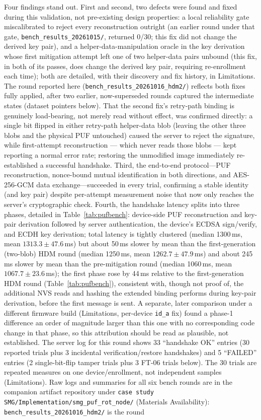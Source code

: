\documentclass[preprint,12pt,authoryear]{elsarticle}
\begin{document}
Four findings stand out. First and second, two defects were found and fixed during this validation, not pre-existing design properties: a local reliability gate miscalibrated to reject every reconstruction outright (an earlier round under that gate, \texttt{bench\_results\_20261015/}, returned 0/30; this fix did not change the derived key pair), and a helper-data-manipulation oracle in the key derivation whose first mitigation attempt left one of two helper-data pairs unbound (this fix, in both of its passes, does change the derived key pair, requiring re-enrollment each time); both are detailed, with their discovery and fix history, in Limitations. The round reported here (\texttt{bench\_results\_20261016\_hdm2/}) reflects both fixes fully applied, after two earlier, now-superseded rounds captured the intermediate states (dataset pointers below). That the second fix's retry-path binding is genuinely load-bearing, not merely read without effect, was confirmed directly: a single bit flipped in either retry-path helper-data blob (leaving the other three blobs and the physical PUF untouched) caused the server to reject the signature, while first-attempt reconstruction --- which never reads those blobs --- kept reporting a normal error rate; restoring the unmodified image immediately re-established a successful handshake. Third, the end-to-end protocol---PUF reconstruction, nonce-bound mutual identification in both directions, and AES-256-GCM data exchange---succeeded in every trial, confirming a stable identity (and key pair) despite per-attempt measurement noise that now only reaches the server's cryptographic check. Fourth, the handshake latency splits into three phases, detailed in Table~\ref{tab:pufbench}: device-side PUF reconstruction and key-pair derivation followed by server authentication, the device's ECDSA sign/verify, and ECDH key derivation; total latency is tightly clustered (median 1300\,ms, mean $1313.3\pm47.6$\,ms) but about 50\,ms slower by mean than the first-generation (two-blob) HDM round (median 1250\,ms, mean $1262.7\pm47.9$\,ms) and about 245\,ms slower by mean than the pre-mitigation round (median 1060\,ms, mean $1067.7\pm23.6$\,ms); the first phase rose by 44\,ms relative to the first-generation HDM round (Table~\ref{tab:pufbench}), consistent with, though not proof of, the additional NVS reads and hashing the extended binding performs during key-pair derivation, before the first message is sent. A separate, later comparison under a different firmware build (Limitations, per-device \texttt{id\_a} fix) found a phase-1 difference an order of magnitude larger than this one with no corresponding code change in that phase, so this attribution should be read as plausible, not established. The server log for this round shows 33 ``handshake OK'' entries (30 reported trials plus 3 incidental verification/restore handshakes) and 5 ``FAILED'' entries (2 single-bit-flip tamper trials plus 3 FT-06 trials below). The 30 trials are repeated measures on one device/enrollment, not independent samples (Limitations). Raw logs and summaries for all six bench rounds are in the companion artifact repository under \texttt{case study SMG/\allowbreak Implementation/\allowbreak smg\_puf\_rot\_node/} (Materials Availability): \texttt{bench\_results\_20261016\_hdm2/} is the round 
\end{document}

